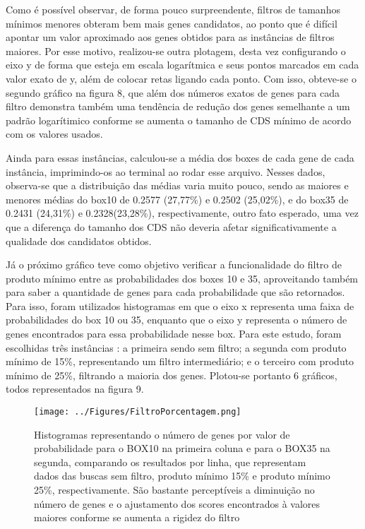 \documentclass[brazilian,12pt,a4paper,final]{article}
\begin{document}
	
	\vspace{0.5cm}
	
	Como é possível observar, de forma pouco surpreendente, filtros de tamanhos mínimos menores obteram bem mais genes candidatos, ao ponto que é difícil apontar um valor aproximado aos genes obtidos para as instâncias de filtros maiores. Por esse motivo, realizou-se outra plotagem, desta vez configurando o eixo y de forma que esteja em escala logarítmica e seus pontos marcados em cada valor exato de y, além de colocar retas ligando cada ponto. Com isso, obteve-se o segundo gráfico na figura 8, que além dos números exatos de genes para cada filtro demonstra também uma tendência de redução dos genes semelhante a um padrão logarítimico conforme se aumenta o tamanho de CDS mínimo de acordo com os valores usados.
	
	\vspace{0.5cm}
	
	Ainda para essas instâncias, calculou-se a média dos boxes de cada gene de cada instância, imprimindo-os ao terminal ao rodar esse arquivo. Nesses dados, observa-se que a distribuição das médias varia muito pouco, sendo as maiores e menores médias do box10 de 0.2577 (27,77\%) e 0.2502 (25,02\%), e do box35 de 0.2431 (24,31\%) e 0.2328(23,28\%), respectivamente, outro fato esperado, uma vez que a diferença do tamanho dos CDS não deveria afetar significativamente a qualidade dos candidatos obtidos.
	
	\vspace{0.5cm}
	
	Já o próximo gráfico teve como objetivo verificar a funcionalidade do filtro de produto mínimo entre as probabilidades dos boxes 10 e 35, aproveitando também para saber a quantidade de genes para cada probabilidade que são retornados. Para isso, foram utilizados histogramas em que o eixo x representa uma faixa de probabilidades do box 10 ou 35, enquanto que o eixo y representa o número de genes encontrados para essa probabilidade nesse box. Para este estudo, foram escolhidas três instâncias : a primeira sendo sem filtro; a segunda com produto mínimo de 15\%, representando um filtro intermediário; e o terceiro com produto mínimo de 25\%, filtrando a maioria dos genes. Plotou-se portanto 6 gráficos, todos representados na figura 9.
	
	\begin{figure}[hbtp]
		\begin{center}
			\texttt{[image: ../Figures/FiltroPorcentagem.png]}
			\caption{Histogramas representando o número de genes por valor de probabilidade para o BOX10 na primeira coluna e para o BOX35 na segunda, comparando os resultados por linha, que representam dados das buscas sem filtro, produto mínimo 15\% e produto mínimo 25\%, respectivamente. São bastante perceptíveis a diminuição no número de genes e o ajustamento dos scores encontrados à valores maiores conforme se aumenta a rigidez do filtro}
			\label{fig}
		\end{center}
	\end{figure}
	
\end{document}
